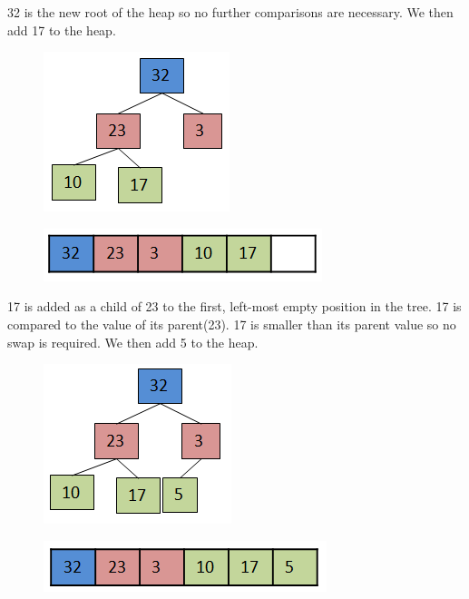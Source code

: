 32 is the new root of the heap so no further comparisons are necessary.   We then add 17 to the heap.

\begin{figure}[H]
\centering
\includegraphics{pictures/heap8.png}
\label{fig:heap8}
\end{figure}

\begin{figure}[H]
\centering
\includegraphics{pictures/heap8a.png}
\label{fig:heap8a}
\end{figure}

17 is added as a child of 23 to the first, left-most empty position in the tree.  17 is compared to the value of its parent(23).  17 is smaller than its parent value so no swap is required.   We then add 5 to the heap.

\begin{figure}[H]
\centering
\includegraphics{pictures/heap9.png}
\label{fig:heap9}
\end{figure}

\begin{figure}[H]
\centering
\includegraphics{pictures/heap9a.png}
\label{fig:heap9a}
\end{figure}

